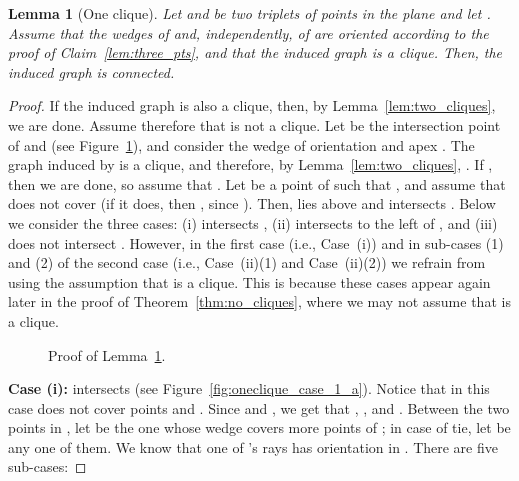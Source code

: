 \documentclass[11pt]{article}
\newtheorem{lemma}[theorem]{Lemma}
\begin{document}
\begin{lemma}[One clique]\label{lem:one_clique}
Let  and  be two triplets of points in the plane and let .
Assume that the wedges of  and, independently, of  are oriented according to the proof of 
Claim~\ref{lem:three_pts}, and that the induced graph  is a clique.
Then, the induced graph  is connected.
\end{lemma}

\begin{proof}
If the induced graph  is also a clique, then, by Lemma~\ref{lem:two_cliques}, we are done.
Assume therefore that  is not a clique. 
Let  be the intersection point of  and  (see Figure~\ref{fig:oneclique}), and consider the wedge  of orientation  and apex .
The graph induced by  is a clique, and therefore, by Lemma~\ref{lem:two_cliques}, .
If , then we are done, so assume that .
Let  be a point of  such that , and assume that  does not cover  (if it does, then , since ). Then,  lies above  and  intersects .
Below we consider the three cases: (i)  intersects , (ii)  intersects  to the left of , and (iii)  does not intersect . However, in the first case (i.e., Case~(i)) and in sub-cases (1) and (2) of the second case (i.e., Case~(ii)(1) and Case~(ii)(2)) we refrain from using the assumption that  is a clique. This is because these cases appear again later in the proof of Theorem\mbox{~\ref{thm:no_cliques}}, where we may not assume that  is a clique.  


\begin{figure}[htb]
 \centering 
	\caption{Proof of Lemma~\ref{lem:one_clique}.}	\label{fig:oneclique}
\end{figure}



{\bf Case (i):}  intersects  (see Figure~\ref{fig:oneclique_case_1_a}). Notice that in this case  does not cover points  and . Since  and , we get that , , and
.
Between the two points in , let  be the one whose wedge covers more points of ; in case of tie, let  be any one of them. We know that one of 's rays has orientation in .
There are five sub-cases:


\end{proof}
\end{document}
